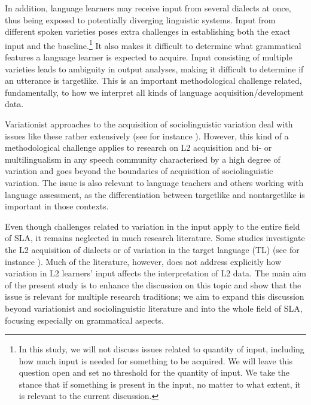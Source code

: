 \documentclass[output=paper,colorlinks,citecolor=brown,modfonts,nonflat]{../langscibook}
\begin{document}
In addition, language learners may receive input from several dialects at once, thus being exposed to potentially diverging linguistic systems. Input from different spoken varieties poses extra challenges in establishing both the exact input and the baseline.\footnote{{In this study, we will not discuss issues related to quantity of input, including how much input is needed for something to be acquired. We will leave this question open and set no threshold for the quantity of input. We take the stance that if something is present in the input, no matter to what extent, it is relevant to the current discussion.}} It also makes it difficult to determine what grammatical features a language learner is expected to acquire. Input consisting of multiple varieties leads to ambiguity in output analyses, making it difficult to determine if an utterance is targetlike. This is an important methodological challenge related, fundamentally, to how we interpret all kinds of language acquisition/development data.


Variationist approaches to the acquisition of sociolinguistic variation deal with issues like these rather extensively (see for instance \citealt{Geeslin2011}). However, this kind of a methodological challenge applies to research on L2 acquisition and bi- or multilingualism in any speech community characterised by a high degree of variation and goes beyond the boundaries of acquisition of sociolinguistic variation. The issue is also relevant to language teachers and others working with language assessment, as the differentiation between targetlike and nontargetlike is important in those contexts. 



Even though challenges related to variation in the input apply to the entire field of SLA, it remains neglected in much research literature. Some studies investigate the L2 acquisition of dialects or of variation in the target language (TL) (see for instance \citealt{GeeslinGudmestad2008,Schmidt2011,GeeslinEtAl2012,RodinaWestergaard2015Bilingualism}). Much of the literature, however, does not address explicitly how variation in L2 learners’ input affects the interpretation of L2 data. The main aim of the present study is to enhance the discussion on this topic and show that the issue is relevant for multiple research traditions; we aim to expand this discussion beyond variationist and sociolinguistic literature and into the whole field of SLA, focusing especially on grammatical aspects.
\end{document}
